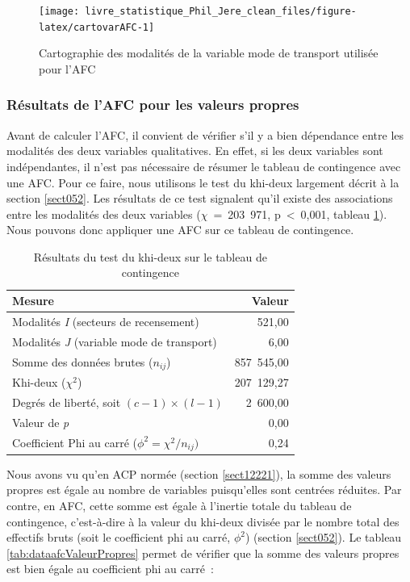 \documentclass[
  11pt,
  french,
]{book}
\begin{document}
\begin{figure}

{\centering \texttt{[image: livre\_statistique\_Phil\_Jere\_clean\_files/figure-latex/cartovarAFC-1]} 

}

\caption{Cartographie des modalités de la variable mode de transport utilisée pour l'AFC}\label{fig:cartovarAFC}
\end{figure}

\hypertarget{sect12321}{%
\subsubsection{Résultats de l'AFC pour les valeurs propres}\label{sect12321}}

Avant de calculer l'AFC, il convient de vérifier s'il y a bien dépendance entre les modalités des deux variables qualitatives. En effet, si les deux variables sont indépendantes, il n'est pas nécessaire de résumer le tableau de contingence avec une AFC. Pour ce faire, nous utilisons le test du khi-deux largement décrit à la section \ref{sect052}. Les résultats de ce test signalent qu'il existe des associations entre les modalités des deux variables (\(\chi\)~=~203~971, p~\textless~0,001, tableau \ref{tab:dataafckhi2}). Nous pouvons donc appliquer une AFC sur ce tableau de contingence.

\begin{table}

\caption{\label{tab:dataafckhi2}Résultats du test du khi-deux sur le tableau de contingence}
\centering
\fontsize{8}{10}\selectfont
\begin{tabular}[t]{lr}
\toprule
Mesure & Valeur\\
\midrule
Modalités \textit{I} (secteurs de recensement) & 521,00\\
Modalités \textit{J} (variable mode de transport) & 6,00\\
Somme des données brutes ($n_{ij}$) & 857 545,00\\
Khi-deux ($\chi^2$) & 207 129,27\\
Degrés de liberté, soit $(c-1)\times(l-1)$ & 2 600,00\\
\addlinespace
Valeur de \textit{p} & 0,00\\
Coefficient Phi au carré ($\phi^2=\chi^2 / n_{ij})$ & 0,24\\
\bottomrule
\end{tabular}
\end{table}

Nous avons vu qu'en ACP normée (section \ref{sect12221}), la somme des valeurs propres est égale au nombre de variables puisqu'elles sont centrées réduites. Par contre, en AFC, cette somme est égale à l'inertie totale du tableau de contingence, c'est-à-dire à la valeur du khi-deux divisée par le nombre total des effectifs bruts (soit le coefficient phi au carré, \(\phi^2\)) (section \ref{sect052}). Le tableau \ref{tab:dataafcValeurPropres} permet de vérifier que la somme des valeurs propres est bien égale au coefficient phi au carré~:
\end{document}
